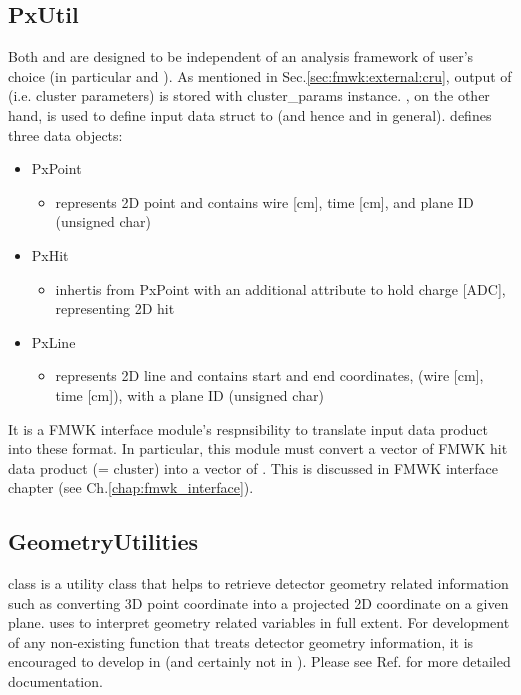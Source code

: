\subsection{{\ttfamily PxUtil}}
\label{sec:fmwk:external:pxutil}
Both {\cru} and {\cmtool} are designed to be independent of an analysis framework of user's choice (in particular {\larlight} and {\larsoft}). 
As mentioned in Sec.\ref{sec:fmwk:external:cru}, output of {\cpan} (i.e. cluster parameters) is stored with {\ttfamily cluster\_params} instance. 
{\pxutil}, on the other hand, is used to define input data struct to {\cpan} (and hence {\cmtool} and {\cru} in general). {\pxutil} defines three data objects:
\begin{itemize}
  \item {\ttfamily PxPoint}
    \begin{itemize}
    \item represents 2D point and contains wire [cm], time [cm], and plane ID (unsigned char)
    \end{itemize}
  \item {\ttfamily PxHit}
    \begin{itemize}
    \item inhertis from {\ttfamily PxPoint} with an additional attribute to hold charge [ADC], representing 2D hit
    \end{itemize}
  \item {\ttfamily PxLine}
    \begin{itemize}
    \item represents 2D line and contains start and end coordinates, (wire [cm], time [cm]), with a plane ID (unsigned char)
    \end{itemize}
\end{itemize}

It is a FMWK interface module's respnsibility to translate input data product into these format. In particular, this module must convert a vector of FMWK hit data product (= cluster) into a vector of {\pxhit}. This is discussed in FMWK interface chapter (see Ch.\ref{chap:fmwk_interface}).

\subsection{{\ttfamily GeometryUtilities}}
\label{sec:fmwk:external:geoutil}
{\CPP} class {\geoutil} is a utility class that helps to retrieve detector geometry related information such as converting 3D point coordinate into a projected 2D coordinate on a given plane. 
{\cmtool} uses {\geoutil} to interpret geometry related variables in full extent. 
For development of any non-existing function that treats detector geometry information, it is encouraged to develop in {\geoutil} (and certainly not in {\cmtool}). 
Please see Ref.\cite{GeometryUtilities} for more detailed documentation.

